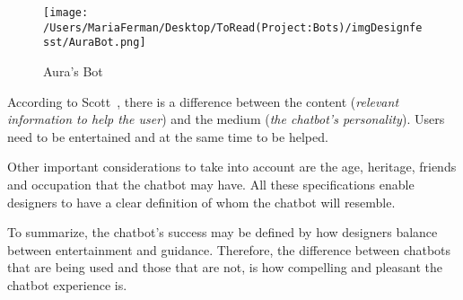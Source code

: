\documentclass[a4paper,10pt]{article}
\begin{document}
\begin{figure}
\centering
\texttt{[image: /Users/MariaFerman/Desktop/ToRead(Project:Bots)/imgDesignfesst/AuraBot.png]}
\caption{Aura's Bot}
\label{FigureAura}
\end{figure}

According to Scott~\cite{HeuristicsWebPage}, there is a difference between the content (\textit{relevant information to help the user}) and the medium (\textit{the chatbot’s personality}). Users need to be entertained and at the same time to be helped.      


Other important considerations to take into account are the age, heritage, friends and occupation that the chatbot may have. All these specifications enable designers to have a clear definition of whom the chatbot will resemble.

To summarize, the chatbot’s success may be defined by how designers balance between entertainment and guidance. Therefore, the difference between chatbots that are being used and those that are not, is how compelling and pleasant the chatbot experience is.


\end{document}
